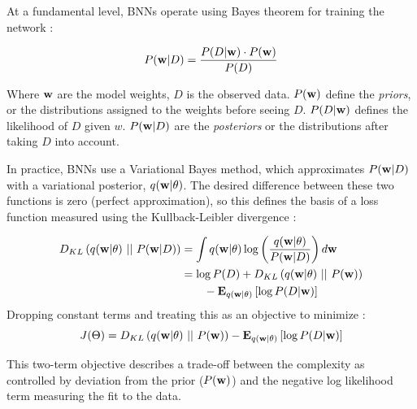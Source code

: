 At a fundamental level, BNNs operate using Bayes theorem for training the network \citep{webster_probabilistic_2021}:

\begin{equation}
    \label{eq:bayesrule}
    P({\bf w} \vert D) = \frac{P(D \vert {\bf w}) \cdot P({\bf w})}{P(D)}
\end{equation}

Where ${\bf w}$ are the model weights, $D$ is the observed data. $P({\bf w})$ define the \textit{priors}, or the distributions assigned to the weights before seeing $D$. $P(D \vert {\bf w})$ defines the likelihood of $D$ given $w$. $P({\bf w} \vert D)$ are the \textit{posteriors} or the distributions after taking $D$ into account.

In practice, BNNs use a Variational Bayes method, which approximates $P({\bf w} \vert D)$ with a variational posterior, $q({\bf w} \vert \theta)$. The desired difference between these two functions is zero (perfect approximation), so this defines the basis of a loss function measured using the Kullback-Leibler divergence \citep{webster_probabilistic_2021}:

\begin{equation}
    \label{eq:bnn_loss}
    \begin{aligned}
    D_{KL}\left(q({\bf w} \vert \theta)\ \vert\vert\ P({\bf w} \vert D)\right) &= \int{q({\bf w} \vert \theta) \log \left({\frac{q({\bf w} \vert \theta)}{P({\bf w} \vert D)}}\right) d{\bf w}} \\
    &= \log P(D) + D_{KL}\left(q({\bf w} \vert \theta)\ \vert\vert\ P({\bf w})\right) \\ 
    &\qquad- \mathbf{E}_{q({\bf w} \vert \theta)}\left[\log P(D \vert {\bf w})\right]
    \end{aligned}
\end{equation}
Dropping constant terms and treating this as an objective to minimize \citep{blundell_weight_2015}:
\begin{equation}
    \label{eq:bnn_objective}
    J(\Theta) = D_{KL}\left(q({\bf w} \vert \theta)\ \vert\vert\ P({\bf w})\right) - \mathbf{E}_{q({\bf w} \vert \theta)}\left[\log P(D \vert {\bf w})\right]
\end{equation}

This two-term objective describes a trade-off between the complexity as controlled by deviation from the prior ($P({\bf w})$) and the negative log likelihood term measuring the fit to the data.

